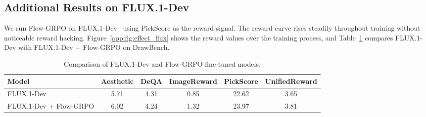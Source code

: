\subsection{Additional Results on FLUX.1-Dev}\label{app:subsec:flux}
We run Flow-GRPO on FLUX.1-Dev~\cite{flux2024} using PickScore as the reward signal. The reward curve rises steadily throughout training without noticeable reward hacking. Figure~\ref{app:fig:effect_flux} shows the reward values over the training process, and Table~\ref{tab:flux_flowgrpo_results} compares FLUX.1-Dev with FLUX.1-Dev + Flow-GRPO on DrawBench.

\begin{table}[h]
\centering
\small
\caption{Comparison of FLUX.1-Dev and Flow-GRPO fine-tuned models.}
\begin{tabular}{lccccc}
\toprule
\textbf{Model} & \textbf{Aesthetic} & \textbf{DeQA} & \textbf{ImageReward} & \textbf{PickScore} & \textbf{UnifiedReward} \\
\midrule
FLUX.1-Dev & 5.71 & 4.31 & 0.85 & 22.62 & 3.65 \\
FLUX.1-Dev + Flow-GRPO & 6.02 & 4.24 & 1.32 & 23.97 & 3.81 \\
\bottomrule
\end{tabular}
\label{tab:flux_flowgrpo_results}
\end{table}



